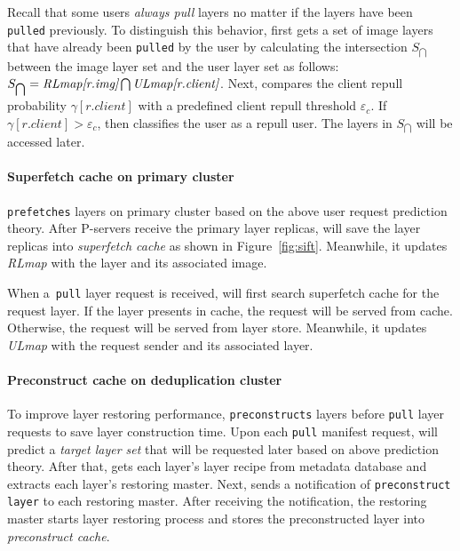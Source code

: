 Recall that some users \emph{always pull} layers no matter if the layers have been \texttt{pulled} previously.
To distinguish this behavior,  
\sysname first gets a set of image layers that have already been \texttt{pulled} by the user by calculating the 
intersection $S_{\bigcap}$ between the image layer set and the user layer set as follows:
$S_{\bigcap} = \emph{RLmap[r.img]} \bigcap \emph{ULmap[r.client]} $.
Next, 
\sysname compares the client repull probability $\gamma[r.client]$ with a predefined client repull threshold $\varepsilon_{c}$.
If $\gamma[r.client] > \varepsilon_{c}$, 
then \sysname classifies the user as a repull user.
The layers in $S_{\bigcap}$ will be accessed later.

%

\paragraph{Superfetch cache  on primary cluster} 
\sysname \texttt{prefetches} layers on primary cluster based on the above user request prediction theory.
After P-servers receive the primary layer replicas,
\sysname will save the layer replicas into \emph{superfetch cache} as shown in Figure~\ref{fig:sift}.
Meanwhile, it updates \emph{RLmap} with the layer and its associated image. 

When a~\texttt{pull} layer request is received, 
\sysname will first search superfetch cache for the request layer.
If the layer presents in cache, the request will be served from cache.
Otherwise,
the request will be served from layer store.
Meanwhile, it updates \emph{ULmap} with the request sender and its associated layer. 



\paragraph{Preconstruct cache on deduplication cluster}
%
To improve layer restoring performance,
\sysname \texttt{preconstructs} layers before \texttt{pull} layer requests to save layer construction time.
Upon each \texttt{pull} manifest request,
\sysname will predict a \emph{target layer set} that will be requested later based on above prediction theory.
%
After that,
\sysname gets each layer's layer recipe from metadata database
and extracts each layer's restoring master.
Next,
\sysname sends a notification of \texttt{preconstruct layer} to
each restoring master.
After receiving the notification, 
the restoring master starts layer restoring process and stores the preconstructed layer into \emph{preconstruct cache}.


